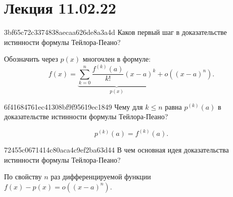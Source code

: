 
\section{Лекция 11.02.22}
\begin{note}{3bf65c72c3374838aecaa626de8a3a4d}
    Каков первый шаг в доказательстве истинности формулы Тейлора-Пеано?

    \begin{cloze}{1}
        Обозначить через \( p(x) \) многочлен в формуле:
        \[
            f(x) = \underbrace{\sum_{k=0}^{n} \frac{f^{(k)} (a)}{k!} (x - a)^{k}}_{p(x)}  + o((x - a)^{n} ).
        \]
    \end{cloze}
\end{note}

\begin{note}{6f41684761ec41308bf9f95619ec1849}
    Чему для \( k \leqslant n \) равна \( p^{(k)} (a) \) в доказательстве истинности формулы Тейлора-Пеано?

    \begin{cloze}{1}
        \[
            p^{(k)} (a) = f^{(k)} (a).
        \]
    \end{cloze}
\end{note}

\begin{note}{72455c0671414c80aca4c9ef2ba63d44}
    В чем основная идея доказательства истинности формулы Тейлора-Пеано?

    \begin{cloze}{1}
        По свойству \( n \) раз дифференцируемой функции \( f(x) - p(x) = o((x - a)^{n} )\).
    \end{cloze}
\end{note}

